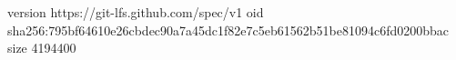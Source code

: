 version https://git-lfs.github.com/spec/v1
oid sha256:795bf64610e26cbdec90a7a45dc1f82e7c5eb61562b51be81094c6fd0200bbac
size 4194400
